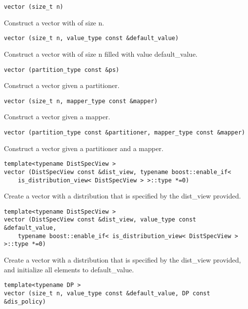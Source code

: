 \begin{verbatim}
vector (size_t n)
\end{verbatim}

Construct a vector with of size n. 
 
\begin{verbatim}
vector (size_t n, value_type const &default_value)
\end{verbatim}

Construct a vector with of size n filled with value default\_value. 
 
\begin{verbatim}
vector (partition_type const &ps)
\end{verbatim}

Construct a vector given a partitioner. 
 
\begin{verbatim}
vector (size_t n, mapper_type const &mapper)
\end{verbatim}

Construct a vector given a mapper. 
 
\begin{verbatim}
vector (partition_type const &partitioner, mapper_type const &mapper)
\end{verbatim}

Construct a vector given a partitioner and a mapper. 
 
\begin{verbatim}
template<typename DistSpecView >
vector (DistSpecView const &dist_view, typename boost::enable_if< 
    is_distribution_view< DistSpecView > >::type *=0)
\end{verbatim}

Create a vector with a distribution that is specified by the dist\_view provided. 
 
\begin{verbatim}
template<typename DistSpecView >
vector (DistSpecView const &dist_view, value_type const &default_value, 
    typename boost::enable_if< is_distribution_view< DistSpecView > >::type *=0)
\end{verbatim}

Create a vector with a distribution that is specified by the dist\_view provided, and initialize all elements to default\_value. 
 
\begin{verbatim}
template<typename DP >
vector (size_t n, value_type const &default_value, DP const &dis_policy)
\end{verbatim}

